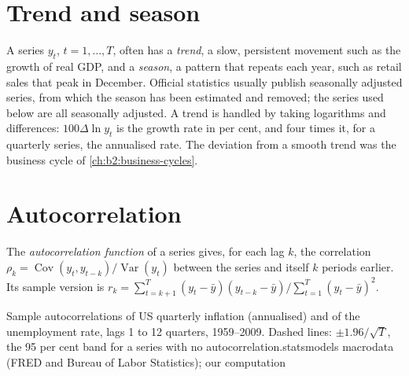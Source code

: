 \section{Trend and season}\label{sec:b2:time-series:trend}

A series $y_t$, $t = 1, \dots, T$, often has a \emph{trend}, a slow, persistent movement such as the growth of real GDP,
and a \emph{season}, a pattern that repeats each year, such as retail sales that peak in December. Official statistics
usually publish seasonally adjusted series, from which the season has been estimated and removed; the series used below
are all seasonally adjusted. A trend is handled by taking logarithms and differences: $100\Delta\ln y_t$ is the growth rate
in per cent, and four times it, for a quarterly series, the annualised rate. The deviation from a smooth trend was the
business cycle of \cref{ch:b2:business-cycles}.

\section{Autocorrelation}\label{sec:b2:time-series:autocorrelation}

\begin{definition}\label{def:b2:time-series:acf}
The \emph{autocorrelation function} of a series gives, for each lag $k$, the correlation
$\rho_k = \operatorname{Cov}(y_t, y_{t-k})/\operatorname{Var}(y_t)$ between the series and itself $k$ periods earlier. Its
sample version is $r_k = \sum_{t=k+1}^T(y_t - \bar y)(y_{t-k} - \bar y)/\sum_{t=1}^T(y_t - \bar y)^2$.
\end{definition}

\begin{omchart}{Sample autocorrelations of US quarterly inflation (annualised) and of the unemployment rate, lags 1 to 12
  quarters, 1959--2009. Dashed lines: $\pm1.96/\sqrt{T}$, the 95 per cent band for a series with no
  autocorrelation.}{statsmodels macrodata (FRED and Bureau of Labor Statistics); our computation}
\end{omchart}

